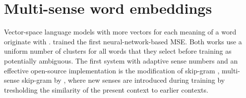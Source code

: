 \documentclass[11pt]{article}
\begin{document}

%



\section{Multi-sense word embeddings}

Vector-space language models with more vectors for each meaning of a
word originate with \cite{Reisinger:2010}.
\cite{Huang:2012} trained the first neural-network-based MSE.
Both works use a uniform number of clusters for all words that they select
before training as potentially ambiguous.
The first system with adaptive sense numbers and an effective open-source
implementation is the 
modification of skip-gram \cite{Mikolov:2013d}, multi-sense skip-gram by
\cite{Neelakantan:2014}, where new senses are introduced during training by
tresholding the similarity of the present context to earlier contexts.

\end{document}
